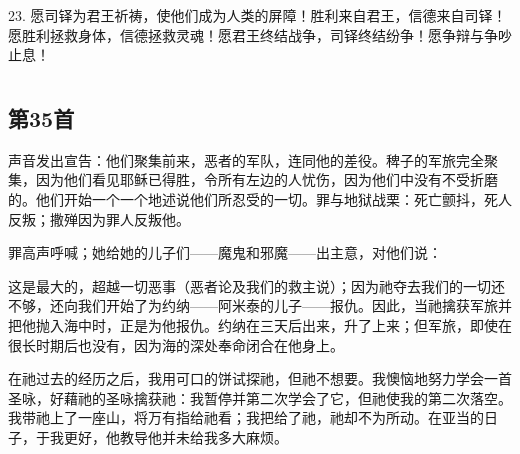 23. 愿司铎为君王祈祷，使他们成为人类的屏障！胜利来自君王，信德来自司铎！愿胜利拯救身体，信德拯救灵魂！愿君王终结战争，司铎终结纷争！愿争辩与争吵止息！\par



\section{}


\subsection{第35首}

\par

声音发出宣告：他们聚集前来，恶者的军队，连同他的差役。稗子的军旅完全聚集，因为他们看见耶稣已得胜，令所有左边的人忧伤，因为他们中没有不受折磨的。他们开始一个一个地述说他们所忍受的一切。罪与地狱战栗：死亡颤抖，死人反叛；撒殚因为罪人反叛他。\par

罪高声呼喊；她给她的儿子们——魔鬼和邪魔——出主意，对他们说：\par

这是最大的，超越一切恶事（恶者论及我们的救主说）；因为祂夺去我们的一切还不够，还向我们开始了为约纳——阿米泰的儿子——报仇。因此，当祂擒获军旅并把他抛入海中时，正是为他报仇。约纳在三天后出来，升了上来；但军旅，即使在很长时期后也没有，因为海的深处奉命闭合在他身上。\par

在祂过去的经历之后，我用可口的饼试探祂，但祂不想要。我懊恼地努力学会一首圣咏，好藉祂的圣咏擒获祂：我暂停并第二次学会了它，但祂使我的第二次落空。我带祂上了一座山，将万有指给祂看；我把给了祂，祂却不为所动。在亚当的日子，于我更好，他教导他并未给我多大麻烦。\par

